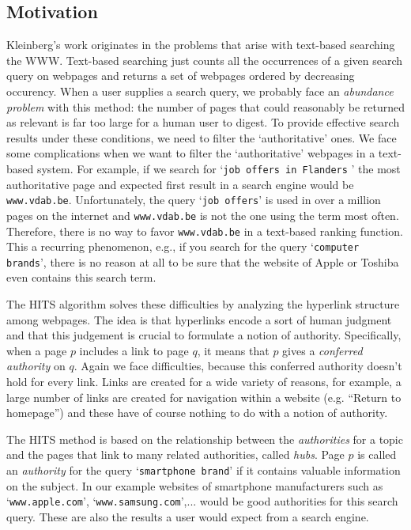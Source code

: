 \documentclass[a4paper,11pt]{report}
\begin{document}
\subsection{Motivation}\label{motivatiehits}
Kleinberg's work originates in the problems that arise with text-based searching the WWW. Text-based searching just counts all the occurrences of a given search query on webpages and returns a set of webpages ordered by decreasing occurency.
When a user 
supplies a search query, we probably face an \textit{abundance problem} with this method: the number of pages that could reasonably be returned as relevant is
far too large for a human user to digest. To provide effective search results 
under these conditions, we need to filter the `authoritative' ones. We face some complications when we
want to filter the `authoritative' webpages in a text-based system. For example, if we search for `\texttt{job offers in Flanders} 
' the most authoritative page and expected first result in a search engine would be \texttt{www.vdab.be}. 
Unfortunately, the query  `\texttt{job offers}' is used in over a 
million pages on the internet and \texttt{www.vdab.be} is not the one using the 
term most often. Therefore, there is no way to favor \texttt{www.vdab.be} in a 
text-based ranking function. This a recurring phenomenon, e.g., if 
you search for the query `\texttt{computer brands}', there is no reason at all to be sure that the 
website of Apple or Toshiba even contains this search term.

The HITS algorithm solves these difficulties by analyzing the hyperlink 
structure among webpages. The idea is that hyperlinks encode a sort of human 
judgment and that this judgement is crucial to formulate a notion of authority. 
Specifically, when a page $p$ includes a link to page $q$, it means 
that $p$ gives a \textit{conferred authority} on $q$. Again we face difficulties, because this conferred authority doesn't 
hold for every link. Links are created for a wide variety of reasons, for 
example, a large number of links are created for navigation within a website (e.g. ``Return to homepage'') 
and these have of course nothing to do with a notion of authority. 

The HITS method is based on the relationship between the \textit{authorities} for a topic 
and the pages that link to many related authorities, called \emph{hubs}. Page $p$ 
is called an \textit{authority} for the query `\texttt{smartphone brand}' if it 
contains valuable information on the subject. In our example websites of 
smartphone manufacturers such as `\texttt{www.apple.com}', 
`\texttt{www.samsung.com}',... would be good authorities for this search 
query. These are also the results a user would expect from a search engine. 
\end{document}

